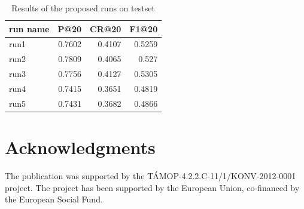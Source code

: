 \documentclass{acm_proc_article-me}
\begin{document}
\begin{table}[t]
\centering
\caption{Results of the proposed runs on testset}
\begin{tabular}{|l|r|r|r|}
	\hline 
	run name & P@20 & CR@20 & F1@20\tabularnewline
	\hline 
	\hline 
	run1 & 0.7602 & 0.4107 & 0.5259\tabularnewline
	\hline 
	run2 & 0.7809 & 0.4065 & 0.527\tabularnewline
	\hline 
	run3 & 0.7756 & 0.4127 & 0.5305\tabularnewline
	\hline 
	run4 & 0.7415 & 0.3651 & 0.4819\tabularnewline
	\hline 
	run5 & 0.7431 & 0.3682 & 0.4866\tabularnewline
	\hline 
\end{tabular}
\label{table:results}
\end{table}



\section{Acknowledgments}

The publication was supported by the T\'AMOP-4.2.2.C-11/1/KONV-2012-0001 project. The project has been supported by the European Union, co-financed by the European Social Fund.



\end{document}
